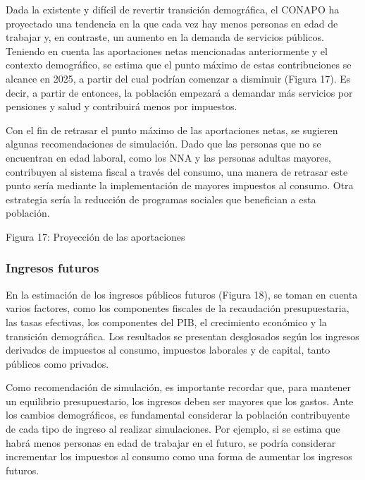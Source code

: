 Dada la existente y difícil de revertir transición demográfica, el
CONAPO ha proyectado una tendencia en la que cada vez hay menos personas
en edad de trabajar y, en contraste, un aumento en la demanda de
servicios públicos. Teniendo en cuenta las aportaciones netas
mencionadas anteriormente y el contexto demográfico, se estima que el
punto máximo de estas contribuciones se alcance en 2025, a partir del
cual podrían comenzar a disminuir (Figura 17). Es decir, a partir de
entonces, la población empezará a demandar más servicios por pensiones y
salud y contribuirá menos por impuestos.

Con el fin de retrasar el punto máximo de las aportaciones netas, se
sugieren algunas recomendaciones de simulación. Dado que las personas
que no se encuentran en edad laboral, como los NNA y las personas
adultas mayores, contribuyen al sistema fiscal a través del consumo, una
manera de retrasar este punto sería mediante la implementación de
mayores impuestos al consumo. Otra estrategia sería la reducción de
programas sociales que benefician a esta población.

Figura 17: Proyección de las aportaciones


\hypertarget{ingresos-futuros}{%
\subsubsection{Ingresos futuros}\label{ingresos-futuros}}

En la estimación de los ingresos públicos futuros (Figura 18), se toman
en cuenta varios factores, como los componentes fiscales de la
recaudación presupuestaria, las tasas efectivas, los componentes del
PIB, el crecimiento económico y la transición demográfica. Los
resultados se presentan desglosados según los ingresos derivados de
impuestos al consumo, impuestos laborales y de capital, tanto públicos
como privados.

Como recomendación de simulación, es importante recordar que, para
mantener un equilibrio presupuestario, los ingresos deben ser mayores
que los gastos. Ante los cambios demográficos, es fundamental considerar
la población contribuyente de cada tipo de ingreso al realizar
simulaciones. Por ejemplo, si se estima que habrá menos personas en edad
de trabajar en el futuro, se podría considerar incrementar los impuestos
al consumo como una forma de aumentar los ingresos futuros.

